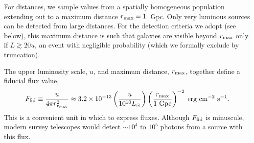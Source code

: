 For distances, we sample values from a spatially homogeneous population extending out to a maximum distance $r_{\rm max} = 1$~Gpc.
Only very luminous sources can be detected from large distances.
For the detection criteria we adopt (see below), this maximum distance is such that galaxies are visible beyond $r_{\rm max}$ only if $L \gtrsim 20u$, an event with negligible probability (which we formally exclude by truncation).



The upper luminosity scale, $u$, and maximum distance, $r_{\rm max}$, together define a fiducial flux value,
\begin{equation}\label{eq:Ffid}
F_{\rm fid}
  \equiv \frac{u}{4\pi r_{r_{\rm max}}^2} 
  \approx 3.2\times 10^{-13} \left(\frac{u}{10^{10} L_\odot}\right)
      \left(\frac{r_{\rm max}}{1~\text{Gpc}}\right)^{-2}\;
      \text{erg cm$^{-2}$ s$^{-1}$}.
\end{equation}
This is a convenient unit in which to express fluxes.
Although $F_{\rm fid}$ is minuscule, modern survey telescopes would detect $\sim 10^4$ to $10^5$ photons from a source with this flux.


